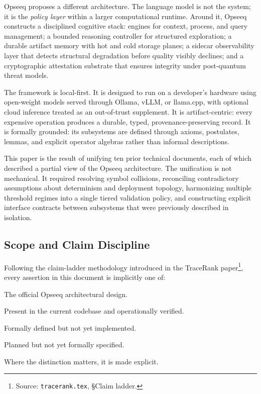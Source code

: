 \documentclass[11pt]{article}
\theoremstyle{remark}
\begin{document}
Opseeq proposes a different architecture. The language model is not the system; it is the \emph{policy layer} within a larger computational runtime. Around it, Opseeq constructs a disciplined cognitive stack: engines for context, process, and query management; a bounded reasoning controller for structured exploration; a durable artifact memory with hot and cold storage planes; a sidecar observability layer that detects structural degradation before quality visibly declines; and a cryptographic attestation substrate that ensures integrity under post-quantum threat models.

The framework is local-first. It is designed to run on a developer's hardware using open-weight models served through Ollama, vLLM, or llama.cpp, with optional cloud inference treated as an out-of-trust supplement. It is artifact-centric: every expensive operation produces a durable, typed, provenance-preserving record. It is formally grounded: its subsystems are defined through axioms, postulates, lemmas, and explicit operator algebras rather than informal descriptions.

This paper is the result of unifying ten prior technical documents, each of which described a partial view of the Opseeq architecture. The unification is not mechanical. It required resolving symbol collisions, reconciling contradictory assumptions about determinism and deployment topology, harmonizing multiple threshold regimes into a single tiered validation policy, and constructing explicit interface contracts between subsystems that were previously described in isolation.

\subsection{Scope and Claim Discipline}
\label{subsec:claim_discipline}

Following the claim-ladder methodology introduced in the TraceRank paper\footnote{Source: \texttt{tracerank.tex}, \S Claim ladder.}, every assertion in this document is implicitly one of:
\begin{description}[leftmargin=2.2cm,style=nextline]
  \item[Normative] The official Opseeq architectural design.
  \item[Implemented] Present in the current codebase and operationally verified.
  \item[Specified] Formally defined but not yet implemented.
  \item[Roadmap] Planned but not yet formally specified.
\end{description}
Where the distinction matters, it is made explicit.
\end{document}
